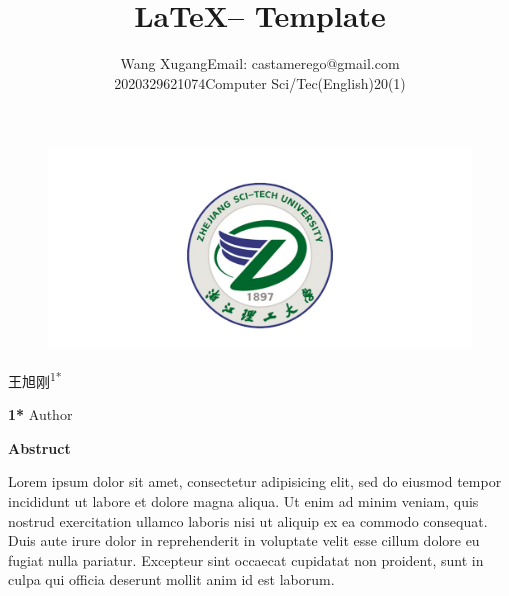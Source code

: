 \documentclass[twoside,11pt]{article}
\makeatletter
\newcommand\studentName{Wang Xugang}
\newcommand\studentEmail{Email: castamerego@gmail.com}
\newcommand\studentNumber{2020329621074}
\newcommand\studentClass{Computer Sci/Tec(English)20(1)}
\makeatother
\begin{document}
\pagestyle{mainFancy}

\begin{figure}[H]
    \centering
    \includegraphics[width=1\columnwidth]{figures/zstu-logo.png}
\end{figure}


\title{\Huge \LaTeX  -- Template}

\vspace{1cm}

\author{\name \studentName \email \studentEmail \\
    \studentNumber \class  \studentClass
    \addr
}

\maketitle
\thispagestyle{empty}

\newpage




\begin{center}
    王旭刚\textsuperscript{1*}

    \bigskip
    \textbf{1*} Author

    \bigskip
\end{center}






\begin{center}
    \Large\textbf{Abstruct}
\end{center}

Lorem ipsum dolor sit amet, consectetur adipisicing elit, sed do eiusmod tempor incididunt ut labore et dolore magna aliqua. Ut enim ad minim veniam, quis nostrud exercitation ullamco laboris nisi ut aliquip ex ea commodo consequat. Duis aute irure dolor in reprehenderit in voluptate velit esse cillum dolore eu fugiat nulla pariatur. Excepteur sint occaecat cupidatat non proident, sunt in culpa qui officia deserunt mollit anim id est laborum.
\end{document}
